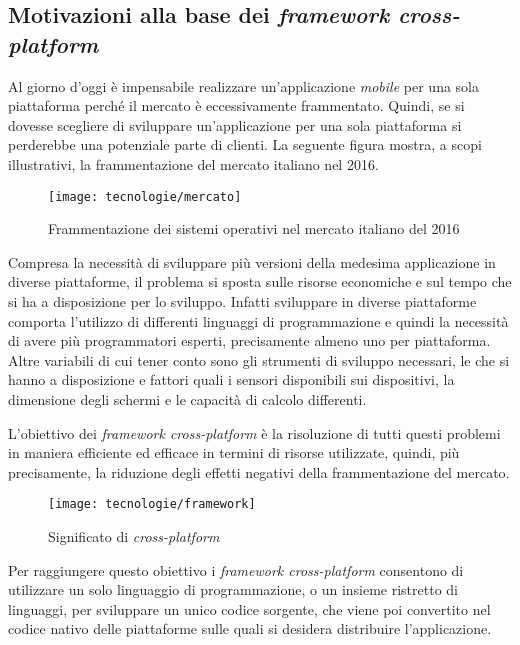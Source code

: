 \subsection{Motivazioni alla base dei \textit{framework cross-platform}}

Al giorno d'oggi è impensabile realizzare un'applicazione \textit{mobile} per una sola piattaforma perché il mercato è eccessivamente frammentato. Quindi, se si dovesse scegliere di sviluppare un'applicazione per una sola piattaforma si perderebbe una potenziale parte di clienti. La seguente figura mostra, a scopi illustrativi, la frammentazione del mercato italiano nel 2016.

\begin{figure}[!h] 
    \centering 
    \texttt{[image: tecnologie/mercato]} 
    \caption{Frammentazione dei sistemi operativi nel mercato italiano del 2016}
\end{figure}

Compresa la necessità di sviluppare più versioni della medesima applicazione in diverse piattaforme, il problema si sposta sulle risorse economiche e sul tempo che si ha a disposizione per lo sviluppo. Infatti sviluppare in diverse piattaforme comporta l'utilizzo di differenti linguaggi di programmazione e quindi la necessità di avere più programmatori esperti, precisamente almeno uno per piattaforma. Altre variabili di cui tener conto sono gli strumenti di sviluppo necessari, le  che si hanno a disposizione e fattori quali i sensori disponibili sui dispositivi, la dimensione degli schermi e le capacità di calcolo differenti.

L'obiettivo dei \textit{framework cross-platform} è la risoluzione di tutti questi problemi in maniera efficiente ed efficace in termini di risorse utilizzate, quindi, più precisamente, la riduzione degli effetti negativi della frammentazione del mercato.

\begin{figure}[!h] 
    \centering 
    \texttt{[image: tecnologie/framework]} 
    \caption{Significato di \textit{cross-platform}}
\end{figure}

Per raggiungere questo obiettivo i \textit{framework cross-platform} consentono di utilizzare un solo linguaggio di programmazione, o un insieme ristretto di linguaggi, per sviluppare un unico codice sorgente, che viene poi convertito nel codice nativo delle piattaforme sulle quali si desidera distribuire l'applicazione. 

